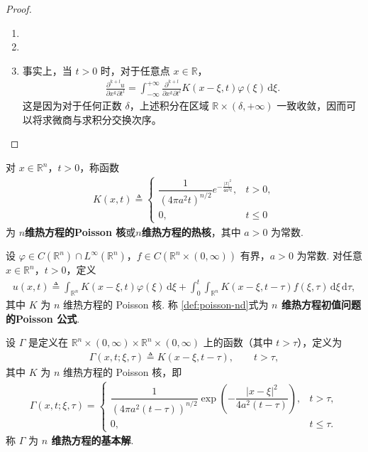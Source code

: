 \documentclass[../../main.tex]{subfiles}%
\begin{document}
\begin{proof}
\begin{enumerate}[(1)]
\item 

\item 

\item 事实上，当 $t>0$ 时，对于任意点 $x\in\mathbb{R}$，
\begin{align*}
\frac{\partial^{k+l}u}{\partial x^k\partial t^l}
=\int_{-\infty}^{+\infty}\frac{\partial^{k+l}}{\partial x^k\partial t^l}K(x-\xi,t)\varphi(\xi)\,\mathrm{d}\xi.
\end{align*}
这是因为对于任何正数 $\delta$，上述积分在区域 $\mathbb{R}\times(\delta,+\infty)$ 一致收敛，因而可以将求微商与求积分交换次序。
\end{enumerate}
\end{proof}


\begin{definition}
对 $x\in\mathbb{R}^n$，$t>0$，称函数
\begin{align*}
K(x,t)\triangleq 
\begin{cases}
\dfrac{1}{(4\pi a^2 t)^{n/2}}e^{-\frac{|x|^2}{4a^2t}}, & t>0,\\[0.4cm]
0, & t\leqslant 0
\end{cases}
\end{align*}
为 \textbf{$n$维热方程的Poisson 核}或\textbf{$n$维热方程的热核}，其中 $a>0$ 为常数.
\end{definition}

\begin{definition}
设 $\varphi\in C(\mathbb{R}^n)\cap L^\infty(\mathbb{R}^n)$，$f\in C(\mathbb{R}^n\times(0,\infty))$ 有界，$a>0$ 为常数. 对任意 $x\in\mathbb{R}^n$，$t>0$，定义
\begin{align}
u(x,t)\triangleq \int_{\mathbb{R}^n}K(x-\xi,t)\varphi(\xi)\,\mathrm{d}\xi
+\int_0^t\int_{\mathbb{R}^n}K(x-\xi,t-\tau)f(\xi,\tau)\,\mathrm{d}\xi\,\mathrm{d}\tau, \label{def:poisson-nd}
\end{align}
其中 $K$ 为 $n$ 维热方程的 Poisson 核. 称 \eqref{def:poisson-nd}式为 \textbf{$n$ 维热方程初值问题的Poisson 公式}.
\end{definition}

\begin{definition}
设 $\varGamma$ 是定义在 $\mathbb{R}^n\times(0,\infty)\times\mathbb{R}^n\times(0,\infty)$ 上的函数（其中 $t>\tau$），定义为
\begin{align*}
\varGamma(x,t;\xi,\tau)\triangleq K(x-\xi,t-\tau),\qquad t>\tau,
\end{align*}
其中 $K$ 为 $n$ 维热方程的 Poisson 核，即
\begin{align}
\varGamma(x,t;\xi,\tau)=
\begin{cases}
\dfrac{1}{(4\pi a^2(t-\tau))^{n/2}}\exp\left(-\dfrac{|x-\xi|^2}{4a^2(t-\tau)}\right), & t>\tau,\\[0.4cm]
0, & t\leqslant \tau.
\end{cases}
\end{align}
称 $\varGamma$ 为 \textbf{$n$ 维热方程的基本解}.
\end{definition}
\end{document}
